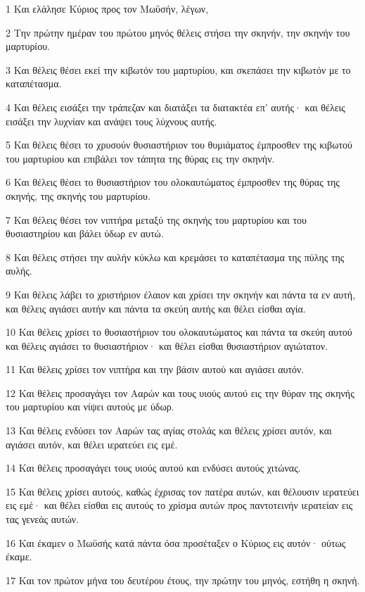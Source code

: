 \par 1 Και ελάλησε Κύριος προς τον Μωϋσήν, λέγων,
\par 2 Την πρώτην ημέραν του πρώτου μηνός θέλεις στήσει την σκηνήν, την σκηνήν του μαρτυρίου.
\par 3 Και θέλεις θέσει εκεί την κιβωτόν του μαρτυρίου, και σκεπάσει την κιβωτόν με το καταπέτασμα.
\par 4 Και θέλεις εισάξει την τράπεζαν και διατάξει τα διατακτέα επ' αυτής· και θέλεις εισάξει την λυχνίαν και ανάψει τους λύχνους αυτής.
\par 5 Και θέλεις θέσει το χρυσούν θυσιαστήριον του θυμιάματος έμπροσθεν της κιβωτού του μαρτυρίου και επιβάλει τον τάπητα της θύρας εις την σκηνήν.
\par 6 Και θέλεις θέσει το θυσιαστήριον του ολοκαυτώματος έμπροσθεν της θύρας της σκηνής, της σκηνής του μαρτυρίου.
\par 7 Και θέλεις θέσει τον νιπτήρα μεταξύ της σκηνής του μαρτυρίου και του θυσιαστηρίου και βάλει ύδωρ εν αυτώ.
\par 8 Και θέλεις στήσει την αυλήν κύκλω και κρεμάσει το καταπέτασμα της πύλης της αυλής.
\par 9 Και θέλεις λάβει το χριστήριον έλαιον και χρίσει την σκηνήν και πάντα τα εν αυτή, και θέλεις αγιάσει αυτήν και πάντα τα σκεύη αυτής και θέλει είσθαι αγία.
\par 10 Και θέλεις χρίσει το θυσιαστήριον του ολοκαυτώματος και πάντα τα σκεύη αυτού και θέλεις αγιάσει το θυσιαστήριον· και θέλει είσθαι θυσιαστήριον αγιώτατον.
\par 11 Και θέλεις χρίσει τον νιπτήρα και την βάσιν αυτού και αγιάσει αυτόν.
\par 12 Και θέλεις προσαγάγει τον Ααρών και τους υιούς αυτού εις την θύραν της σκηνής του μαρτυρίου και νίψει αυτούς με ύδωρ.
\par 13 Και θέλεις ενδύσει τον Ααρών τας αγίας στολάς και θέλεις χρίσει αυτόν, και αγιάσει αυτόν, και θέλει ιερατεύει εις εμέ.
\par 14 Και θέλεις προσαγάγει τους υιούς αυτού και ενδύσει αυτούς χιτώνας.
\par 15 Και θέλεις χρίσει αυτούς, καθώς έχρισας τον πατέρα αυτών, και θέλουσιν ιερατεύει εις εμέ· και θέλει είσθαι εις αυτούς το χρίσμα αυτών προς παντοτεινήν ιερατείαν εις τας γενεάς αυτών.
\par 16 Και έκαμεν ο Μωϋσής κατά πάντα όσα προσέταξεν ο Κύριος εις αυτόν· ούτως έκαμε.
\par 17 Και τον πρώτον μήνα του δευτέρου έτους, την πρώτην του μηνός, εστήθη η σκηνή.
